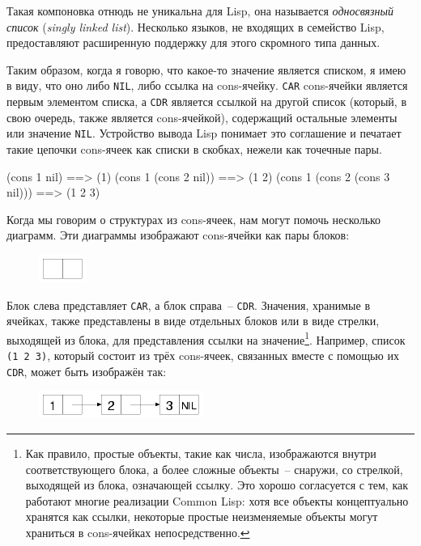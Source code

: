 Такая компоновка отнюдь не уникальна для Lisp, она называется \textit{односвязный
список} (\textit{singly linked list}). Несколько языков, не входящих в семейство Lisp,
предоставляют расширенную поддержку для этого скромного типа данных.

Таким образом, когда я говорю, что какое-то значение является списком, я имею в виду, что
оно либо \lstinline{NIL}, либо ссылка на cons-ячейку. \lstinline{CAR} cons-ячейки является первым
элементом списка, а \lstinline{CDR} является ссылкой на другой список (который, в свою очередь,
также является cons-ячейкой), содержащий остальные элементы или значение
\lstinline{NIL}. Устройство вывода Lisp понимает это соглашение и печатает такие цепочки
cons-ячеек как списки в скобках, нежели как точечные пары.

\begin{myverb}
(cons 1 nil)                   ==> (1)
(cons 1 (cons 2 nil))          ==> (1 2)
(cons 1 (cons 2 (cons 3 nil))) ==> (1 2 3)
\end{myverb}

Когда мы говорим о структурах из cons-ячеек, нам могут помочь несколько диаграмм. Эти
диаграммы изображают cons-ячейки как пары блоков:

\begin{figure}[h]
  \centering
  \includegraphics[scale=0.6]{images/one-cons-cell.png}
\end{figure}

Блок слева представляет \lstinline{CAR}, а блок справа~-- \lstinline{CDR}. Значения, хранимые в
ячейках, также представлены в виде отдельных блоков или в виде стрелки, выходящей из блока,
для представления ссылки на значение\footnote{Как правило, простые объекты, такие как
  числа, изображаются внутри соответствующего блока, а более сложные объекты~-- снаружи, со
  стрелкой, выходящей из блока, означающей ссылку. Это хорошо согласуется с тем, как
  работают многие реализации Common Lisp: хотя все объекты концептуально хранятся как
  ссылки, некоторые простые неизменяемые объекты могут храниться в cons-ячейках
  непосредственно.}. Например, список \lstinline{(1 2 3)}, который состоит из трёх cons-ячеек,
связанных вместе с помощью их \lstinline{CDR}, может быть изображён так:

\begin{figure}[h]
  \centering
  \includegraphics[scale=0.6]{images/list-1-2-3.png}
\end{figure}

